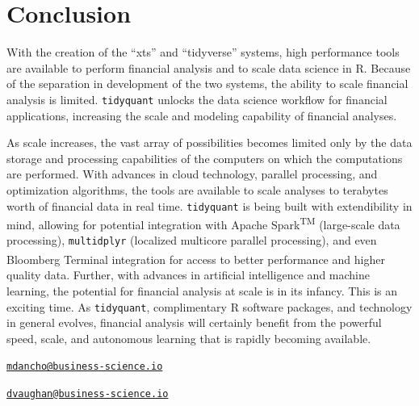 \hspace{20 mm}

\section{Conclusion}\label{conclusion}

With the creation of the ``xts'' and ``tidyverse'' systems, high
performance tools are available to perform financial analysis and to
scale data science in R. Because of the separation in development of the
two systems, the ability to scale financial analysis is limited.
\texttt{tidyquant} unlocks the data science workflow for financial
applications, increasing the scale and modeling capability of financial
analyses.

As scale increases, the vast array of possibilities becomes limited only
by the data storage and processing capabilities of the computers on
which the computations are performed. With advances in cloud technology,
parallel processing, and optimization algorithms, the tools are
available to scale analyses to terabytes worth of financial data in real
time. \texttt{tidyquant} is being built with extendibility in mind,
allowing for potential integration with Apache Spark\textsuperscript{TM}
(large-scale data processing), \texttt{multidplyr} (localized multicore
parallel processing), and even Bloomberg
Terminal\textsuperscript{\textregistered} integration for access to
better performance and higher quality data. Further, with advances in
artificial intelligence and machine learning, the potential for
financial analysis at scale is in its infancy. This is an exciting time.
As \texttt{tidyquant}, complimentary R software packages, and technology
in general evolves, financial analysis will certainly benefit from the
powerful speed, scale, and autonomous learning that is rapidly becoming
available.

\pagebreak



\address{%
Matt Dancho\\
Business Science\\
\\
}
\href{mailto:mdancho@business-science.io}{\nolinkurl{mdancho@business-science.io}}

\address{%
Davis Vaughan\\
Business Science\\
\\
}
\href{mailto:dvaughan@business-science.io}{\nolinkurl{dvaughan@business-science.io}}


